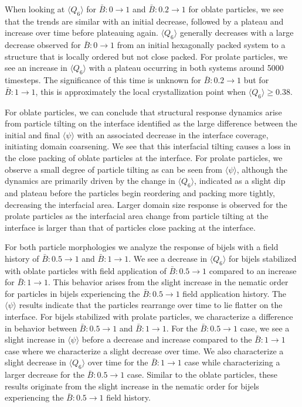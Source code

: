 When looking at \(\langle Q_6 \rangle\) for \(\bar{B}: 0 \rightarrow 1\)
and \(\bar{B}: 0.2 \rightarrow 1\) for oblate particles, we see that the
trends are similar with an initial decrease, followed by a plateau and
increase over time before plateauing again. \(\langle Q_6 \rangle\)
generally decreases with a large decrease observed for
\(\bar{B}: 0 \rightarrow 1\) from an initial hexagonally packed system
to a structure that is locally ordered but not close packed. For prolate
particles, we see an increase in \(\langle Q_6 \rangle\) with a plateau
occurring in both systems around 5000 timesteps. The significance of
this time is unknown for \(\bar{B}: 0.2 \rightarrow 1\) but for
\(\bar{B}: 1 \rightarrow 1\), this is approximately the local
crystallization point when \(\langle Q_6 \rangle \geq 0.38\).

For oblate particles, we can conclude that structural response dynamics
arise from particle tilting on the interface identified as the large
difference between the initial and final \(\langle \psi \rangle\) with
an associated decrease in the interface coverage, initiating domain
coarsening. We see that this interfacial tilting causes a loss in the
close packing of oblate particles at the interface. For prolate
particles, we observe a small degree of particle tilting as can be seen
from \(\langle \psi \rangle\), although the dynamics are primarily
driven by the change in \(\langle Q_6 \rangle\), indicated as a slight
dip and plateau before the particles begin reordering and packing more
tightly, decreasing the interfacial area. Larger domain size response is
observed for the prolate particles as the interfacial area change from
particle tilting at the interface is larger than that of particles close
packing at the interface.

For both particle morphologies we analyze the response of bijels with a
field history of \(\bar{B}: 0.5 \rightarrow 1\) and
\(\bar{B}: 1 \rightarrow 1\). We see a decrease in
\(\langle Q_6 \rangle\) for bijels stabilized with oblate particles with
field application of \(\bar{B}: 0.5 \rightarrow 1\) compared to an
increase for \(\bar{B}: 1 \rightarrow 1\). This behavior arises from the
slight increase in the nematic order for particles in bijels
experiencing the \(\bar{B}: 0.5 \rightarrow 1\) field application
history. The \(\langle \psi \rangle\) results indicate that the
particles rearrange over time to lie flatter on the interface. For
bijels stabilized with prolate particles, we characterize a difference
in behavior between \(\bar{B}: 0.5 \rightarrow 1\) and
\(\bar{B}: 1 \rightarrow 1\). For the \(\bar{B}: 0.5 \rightarrow 1\)
case, we see a slight increase in \(\langle \psi \rangle\) before a
decrease and increase compared to the \(\bar{B}: 1 \rightarrow 1\) case
where we characterize a slight decrease over time. We also characterize
a slight decrease in \(\langle Q_6 \rangle\) over time for the
\(\bar{B}: 1 \rightarrow 1\) case while characterizing a larger decrease
for the \(\bar{B}: 0.5 \rightarrow 1\) case. Similar to the oblate
particles, these results originate from the slight increase in the
nematic order for bijels experiencing the \(\bar{B}: 0.5 \rightarrow 1\)
field history.





